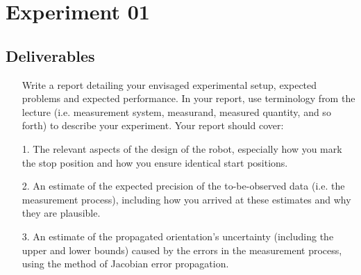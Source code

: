 

    \chapter{Experiment 01}
    \section{Deliverables}
    \begin{itemize}
        \item[] Write a report detailing your envisaged experimental setup, expected problems and expected performance. In your report, use terminology from the lecture (i.e. measurement system, measurand, measured quantity, and so forth) to describe your experiment. Your report should cover:
    \end{itemize}
    
    \begin{itemize}
        \item[1.] The relevant aspects of the design of the robot, especially how you mark the stop position and how you ensure identical start positions.
        \item[2.] An estimate of the expected precision of the to-be-observed data (i.e. the measurement process), including how you arrived at these estimates and why they are plausible.
        \item[3.] An estimate of the propagated orientation’s uncertainty (including the upper and lower bounds) caused by the errors in the measurement process, using the method of Jacobian error propagation.
    \end{itemize}
    

